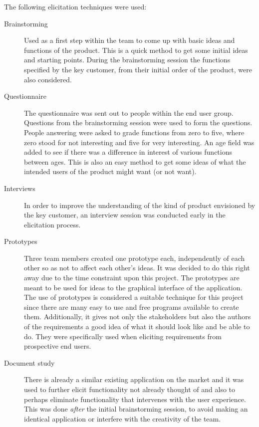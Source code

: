 \documentclass[10pt,a4paper]{article}
\begin{document}
The following elicitation techniques were used:
\begin{description}
\item[Brainstorming] Used as a first step within the team to come up with basic ideas and functions of the product. This is a quick method to get some initial ideas and starting points. During the brainstorming session the functions specified by the key customer, from their initial order of the product, were also considered.

\item[Questionnaire] The questionnaire was sent out to people within the end user group. Questions from the brainstorming session were used to form the questions. People answering were asked to grade functions from zero to five, where zero stood for not interesting and five for very interesting. An age field was added to see if there was a difference in interest of various functions between ages. This is also an easy method to get some ideas of what the intended users of the product might want (or not want).

\item[Interviews] In order to improve the understanding of the kind of product envisioned by the key customer, an interview session was conducted early in the elicitation process. 

\item[Prototypes] Three team members created one prototype each, independently of each other so as not to affect each other's ideas. It was decided to do this right away due to the time constraint upon this project. The prototypes are meant to be used for ideas to the graphical interface of the application. The use of prototypes is considered a suitable technique for this project since there are many easy to use and free programs available to create them. Additionally, it gives not only the stakeholders but also the authors of the requirements a good idea of what it should look like and be able to do. They were specifically used when eliciting requirements from prospective end users.

\item[Document study] There is already a similar existing application on the market and it was used to further elicit functionality not already thought of and also to perhaps eliminate functionality that intervenes with the user experience. This was done \textit{after} the initial brainstorming session, to avoid making an identical application or interfere with the creativity of the team. 

\end{description}
\end{document}
